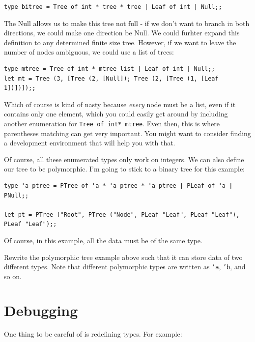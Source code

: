 \documentclass[10pt]{book}
\begin{document}
\beforeverb
\begin{verbatim}
type bitree = Tree of int * tree * tree | Leaf of int | Null;;
\end{verbatim}
\afterverb

The Null allows us to make this tree not full - if we don't want to branch in both directions, we could make one direction be Null. We could furhter expand this definition to any determined finite size tree. However, if we want to leave the number of nodes ambiguous, we could use a list of trees:

\beforeverb
\begin{verbatim}
type mtree = Tree of int * mtree list | Leaf of int | Null;;
let mt = Tree (3, [Tree (2, [Null]); Tree (2, [Tree (1, [Leaf 1])])]);;
\end{verbatim}
\afterverb

Which of course is kind of nasty because {\it every} node must be a list, even if it contains only one element, which you could easily get around by including another enumeration for {\tt Tree of int* mtree}. Even then, this is where parentheses matching can get very important. You might want to consider finding a development environment that will help you with that.

Of course, all these enumerated types only work on integers. We can also define our tree to be polymorphic. I'm going to stick to a binary tree for this example:

\beforeverb
\begin{verbatim}
type 'a ptree = PTree of 'a * 'a ptree * 'a ptree | PLeaf of 'a | PNull;;

let pt = PTree ("Root", PTree ("Node", PLeaf "Leaf", PLeaf "Leaf"), PLeaf "Leaf");;
\end{verbatim}
\afterverb

Of course, in this example, all the data must be of the same type.

\begin{ex}
Rewrite the polymorphic tree example above such that it can store data of two different types. Note that different polymorphic types are written as {\tt 'a}, {\tt 'b}, and so on. 
\end{ex}


\section{Debugging}



One thing to be careful of is redefining types. For example:
\end{document}
